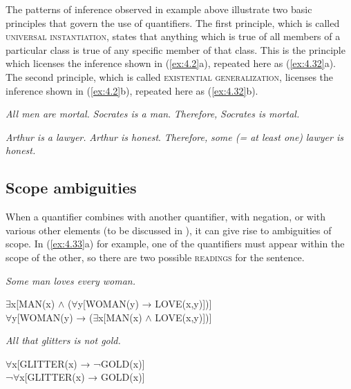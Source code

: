 The patterns of inference observed in example  above illustrate two basic principles that govern the use of quantifiers. The first principle, which is called \textsc{universal instantiation}, states that anything which is true of all members of a particular class is true of any specific member of that class. This is the principle which licenses the inference shown in (\ref{ex:4.2}a), repeated here as (\ref{ex:4.32}a). The second principle, which is called \textsc{existential generalization}, licenses the inference shown in (\ref{ex:4.2}b), repeated here as (\ref{ex:4.32}b).

\settowidth{}
\ea \label{ex:4.32}
\ea  \textit{All men are mortal.}  
\textit{Socrates is a man}.        
\FelixHRule
\textit{Therefore,} \textit{Socrates is mortal.}  
\bigskip

\ex   \textit{Arthur is a lawyer.}                
\textit{Arthur is honest}.                        
\FelixHRule
\textit{Therefore,} \textit{some (= at least one) }  
\hspace{1cm} \textit{lawyer is honest.}
\z \z

\subsection{Scope ambiguities}\label{sec:4.4.2}

When a quantifier combines with another quantifier, with negation, or with various other elements (to be discussed in ), it can give rise to ambiguities of scope. In (\ref{ex:4.33}a) for example, one of the quantifiers must appear within the scope of the other, so there are two possible \textsc{readings} for the sentence.


\ea \label{ex:4.33}
\ea \textit{Some man loves every woman.}\\
  \begin{xlisti} 
      \ex ${\exists}$x[MAN(x) $\wedge$ (${\forall}$y[WOMAN(y) → LOVE(x,y)])]\\
      \ex ${\forall}$y[WOMAN(y) → (${\exists}$x[MAN(x) $\wedge$ LOVE(x,y)])]
  \end{xlisti} 
\ex  \textit{All that glitters is not gold.}\\
  \begin{xlisti}
  \ex ${\forall}$x[GLITTER(x) → ¬GOLD(x)]\\
  \ex ¬${\forall}$x[GLITTER(x) → GOLD(x)]
  \end{xlisti}
\z \z


